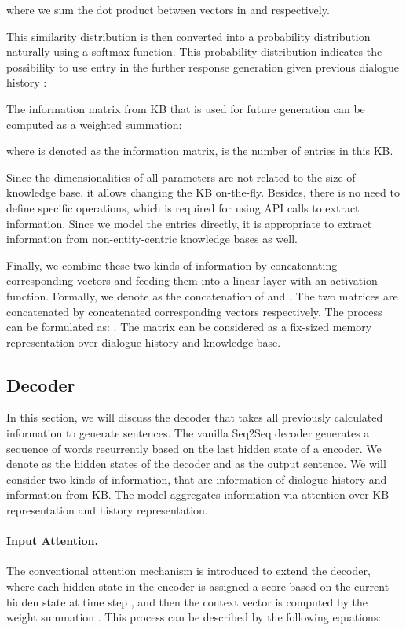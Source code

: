 \documentclass[11pt]{article}
\begin{document}
where we sum the dot product between vectors in  and  respectively. 

This similarity distribution is then converted into a probability distribution naturally using a softmax function. This probability distribution indicates the possibility to use entry  in the further response generation given previous dialogue history  :


The information matrix from KB that is used for future generation can be computed as a weighted summation:

where  is denoted as the information matrix,  is the number of entries in this KB.

Since the dimensionalities of all parameters are not related to the size of knowledge base. it allows changing the KB on-the-fly. Besides, there is no need to define specific operations, which is required for using API calls to extract information. Since we model the entries directly, it is appropriate to extract information from non-entity-centric knowledge bases as well.

Finally, we combine these two kinds of information by concatenating corresponding vectors and feeding them into a linear layer with an activation function. Formally, we denote  as the concatenation of  and . The two matrices are concatenated by concatenated corresponding vectors respectively. The process can be formulated as:
 . The matrix  can be considered as a fix-sized memory representation over dialogue history and knowledge base.

\subsection{Decoder}
In this section, we will discuss the decoder that takes all previously calculated information to generate sentences. The vanilla Seq2Seq decoder generates a sequence of words recurrently based on the last hidden state of a encoder. We denote  as the hidden states of the decoder and  as the output sentence. We will consider two kinds of information, that are information of dialogue history and information from KB. The model aggregates information via attention over KB representation and history representation.
\paragraph{Input Attention.}
The conventional attention mechanism is introduced to extend the decoder, where each hidden state in the encoder is assigned a score based on the current hidden state  at time step , and then the context vector is computed by the weight summation \cite{luong-pham-manning:2015:EMNLP}. This process can be described by the following equations:
\end{document}

